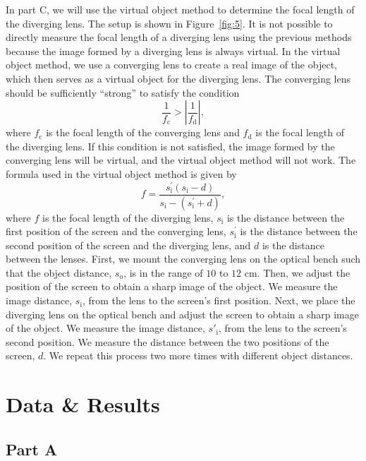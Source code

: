 \documentclass[10pt]{article}
\begin{document}
In part C, we will use the virtual object method to determine the focal length of the diverging lens. The setup is shown in Figure~\ref{fig:5}. It is not possible to directly measure the focal length of a diverging lens using the previous methods because the image formed by a diverging lens is always virtual. In the virtual object method, we use a converging lens to create a real image of the object, which then serves as a virtual object for the diverging lens. The converging lens should be sufficiently \enquote{strong} to satisfy the condition 
\begin{equation}
  \dfrac{1}{f_{\text{c}}} > \left| \dfrac{1}{f_{\text{d}}} \right|,
\end{equation}
where $f_{\text{c}}$ is the focal length of the converging lens and $f_{\text{d}}$ is the focal length of the diverging lens. If this condition is not satisfied, the image formed by the converging lens will be virtual, and the virtual object method will not work. The formula used in the virtual object method is given by
\begin{equation}
  f = \dfrac{s^{'}_{\text{i}} \left( s_{\text{i}} - d \right)}{s_{\text{i}} - \left( s^{'}_{\text{i}} + d \right)},
\end{equation}
where $f$ is the focal length of the diverging lens, $s_{\text{i}}$ is the distance between the first position of the screen and the converging lens, $s^{'}_{\text{i}}$ is the distance between the second position of the screen and the diverging lens, and $d$ is the distance between the lenses. First, we mount the converging lens on the optical bench such that the object distance, $s_{\text{o}}$, is in the range of $10$ to $12$ cm. Then, we adjust the position of the screen to obtain a sharp image of the object. We measure the image distance, $s_{\text{i}}$, from the lens to the screen's first position. Next, we place the diverging lens on the optical bench and adjust the screen to obtain a sharp image of the object. We measure the image distance, $s'_{\text{i}}$, from the lens to the screen's second position. We measure the distance between the two positions of the screen, $d$. We repeat this process two more times with different object distances.


\section{Data \& Results}

\subsection*{Part A}
\end{document}
